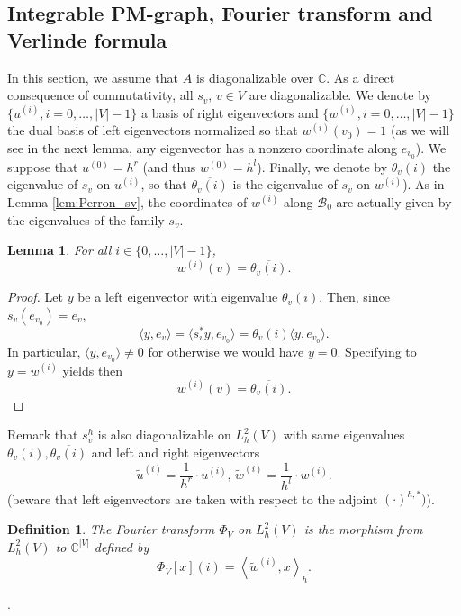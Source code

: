 \documentclass[10pt,11pt]{amsart}%
\newtheorem{definition}[theorem]{Definition}
\newtheorem{lemma}[theorem]{Lemma}
\begin{document}
\subsection{Integrable PM-graph, Fourier transform and Verlinde formula}\label{sec:integrable_graph}
In this section, we assume that $A$ is diagonalizable over $\mathbb{C}$. As a direct consequence of commutativity, all $s_v, \, v\in V$ are diagonalizable. We denote by $\{u^{(i)},i=0,\ldots,|V|-1\}$ a basis of right eigenvectors and $\{w^{(i)},i=0,\ldots,|V|-1\}$  the dual basis of left eigenvectors normalized so that $w^{(i)}(v_0)=1$ (as we will see in the next lemma, any eigenvector has a nonzero coordinate along $e_{v_0}$). We suppose that $u^{(0)}=h^r$ (and thus $w^{(0)}=h^l$). Finally, we denote by $\theta_v(i)$ the eigenvalue of $s_v$ on $u^{(i)}$, so that $\overline{\theta_v(i)}$ is the eigenvalue of $s_v$ on $w^{(i)}$). As in Lemma \ref{lem:Perron_sv}, the coordinates of $w^{(i)}$ along $\mathcal{B}_0$ are actually given by the eigenvalues of the family $s_v$.
\begin{lemma}\label{lem:eigenvalue_eigenvector_relation}
For all $i\in \{0,\ldots,|V|-1\}$,
$$w^{(i)}(v)=\overline{\theta_v(i)}.$$
\end{lemma}
\begin{proof}
Let $y$ be a left eigenvector with eigenvalue $\theta_v(i)$. Then, since $s_v(e_{v_0})=e_v$, 
$$\langle y,e_v\rangle=\langle s_v^*y,e_{v_0}\rangle=\theta_v(i)\langle y,e_{v_0}\rangle.$$
In particular, $\langle y,e_{v_0}\rangle\not=0$ for otherwise we would have $y=0$. Specifying to $y=w^{(i)}$ yields then
$$w^{(i)}(v)=\overline{\theta_v(i)}.$$
\end{proof}
Remark that $s_{v}^h$ is also diagonalizable on $L^2_h(V)$ with same eigenvalues $\theta_v(i),\overline{\theta_v(i)}$ and left and right eigenvectors
$$\tilde{u}^{(i)}=\frac{1}{h^r}\cdot u^{(i)},\, \tilde{w}^{(i)}=\frac{1}{h^l}\cdot w^{(i)}.$$
 (beware that left eigenvectors are taken with respect to the adjoint $(\cdot)^{h,*})$).
 \begin{definition}\label{def:Fourier_transform}
The Fourier transform $\Phi_V$ on $L^2_h(V)$ is the morphism from $L^2_h(V)$ to $\mathbb{C}^{|V|}$ defined by 
$$\Phi_V[x](i)=\left\langle \tilde{w}^{(i)},x\right\rangle_h.$$
\end{definition}.
\end{document}
